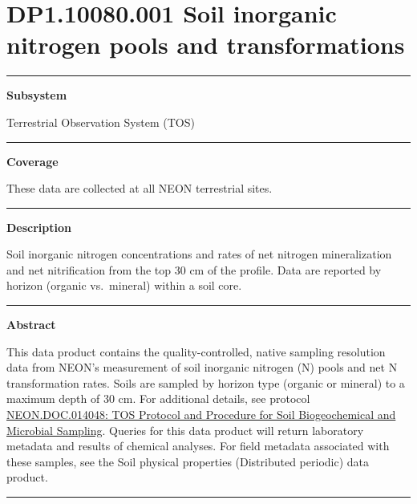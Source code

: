 \documentclass[]{article}
\begin{document}
\section{DP1.10080.001 Soil inorganic nitrogen pools and
transformations}\label{dp1.10080.001-soil-inorganic-nitrogen-pools-and-transformations}

\begin{center}\rule{0.5\linewidth}{\linethickness}\end{center}

\textbf{Subsystem}

Terrestrial Observation System (TOS)

\begin{center}\rule{0.5\linewidth}{\linethickness}\end{center}

\textbf{Coverage}

These data are collected at all NEON terrestrial sites.

\begin{center}\rule{0.5\linewidth}{\linethickness}\end{center}

\textbf{Description}

Soil inorganic nitrogen concentrations and rates of net nitrogen
mineralization and net nitrification from the top 30 cm of the profile.
Data are reported by horizon (organic vs.~mineral) within a soil core.

\begin{center}\rule{0.5\linewidth}{\linethickness}\end{center}

\textbf{Abstract}

This data product contains the quality-controlled, native sampling
resolution data from NEON's measurement of soil inorganic nitrogen (N)
pools and net N transformation rates. Soils are sampled by horizon type
(organic or mineral) to a maximum depth of 30 cm. For additional
details, see protocol
\href{http://data.neonscience.org/api/v0/documents/NEON.DOC.014048vJ}{NEON.DOC.014048:
TOS Protocol and Procedure for Soil Biogeochemical and Microbial
Sampling}. Queries for this data product will return laboratory metadata
and results of chemical analyses. For field metadata associated with
these samples, see the Soil physical properties (Distributed periodic)
data product.

\begin{center}\rule{0.5\linewidth}{\linethickness}\end{center}
\end{document}
